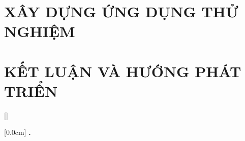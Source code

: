 \documentclass[a4paper,13pt,3p,twoside]{report}
\renewcommand{\bibname}{Danh_sach_tai_lieu_tham_khao}
\theoremstyle{definition}
\begin{document}
\chapter{XÂY DỰNG ỨNG DỤNG THỬ NGHIỆM} %
\label{chapter:conclusion}


\newpage
\chapter{KẾT LUẬN VÀ HƯỚNG PHÁT TRIỂN} %
\label{chapter:reference}



\newpage
\renewcommand\bibname{TÀI LIỆU THAM KHẢO}
\printbibliography
{}

\appendixpage
\appendices
\addappheadtotoc


{}[]
\titlespacing*{\chapter}{0pt}{-20pt}{20pt}

    [0.0cm]             %
    {\bfseries\vspace{0.3cm}}                  %
    {{\bfseries{\scshape} \thecontentslabel.\ }} %
    {}         %
    {\contentspage}         %
\end{document}
